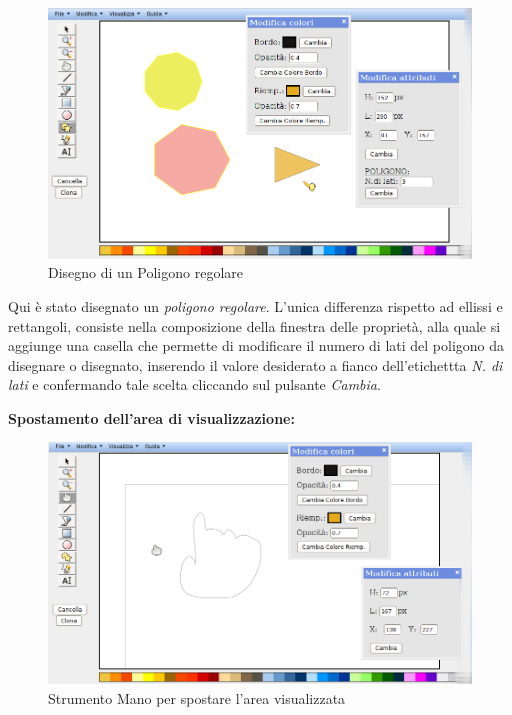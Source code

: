 \begin{figure}[!ht]
\centering
\includegraphics[scale=0.5]{images/poligono.png}
\caption{Disegno di un Poligono regolare}
\end{figure}
 
 
\vspace{50pt}
Qui \`e stato disegnato un \textit{poligono regolare}. L'unica differenza rispetto ad ellissi e rettangoli, consiste nella composizione della finestra delle propriet\`a, alla quale si aggiunge una casella che permette di modificare il numero di lati del poligono da disegnare o disegnato, inserendo il valore desiderato a fianco dell'etichettta \textit{N. di lati} e confermando tale scelta cliccando sul pulsante \textit{Cambia}.
 
\newpage
 
\textbf{Spostamento dell'area di visualizzazione:}\\
\begin{figure}[!ht]
\centering
\includegraphics[scale=0.5]{images/mano.png}
\caption{Strumento Mano per spostare l'area visualizzata}
\end{figure}

